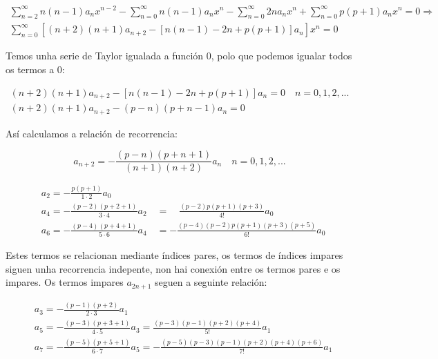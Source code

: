 \documentclass[a4paper,12pt,titlepage]{article}
\begin{document}
\begin{equation*}
    \begin{gathered}
    \sum_{n=2}^{\infty} n(n-1)a_nx^{n-2} - \sum _{n=0}^{\infty} n(n-1)a_n x^n -\sum_{n=0}^{\infty} 2na_nx^n + \sum_{n=0}^{\infty}p(p+1)a_nx^n = 0 \Rightarrow \\
    \sum_{n=0}^{\infty} [(n+2)(n+1)a_{n+2}-[n(n-1)-2n+p(p+1)]a_n]x^n = 0
    \end{gathered}
\end{equation*}

Temos unha serie de Taylor igualada a función 0, polo que podemos igualar todos os termos a 0:

\begin{equation*}
    \begin{gathered}
        (n+2)(n+1)a_{n+2}-[n(n-1)-2n+p(p+1)]a_n = 0 \quad n=0,1,2,... \\
        (n+2)(n+1)a_{n+2} - (p-n)(p+n-1)a_n = 0
    \end{gathered}
\end{equation*}

Así calculamos a relación de recorrencia:

\begin{equation*}
    a_{n+2} = -\frac{(p-n)(p+n+1)}{(n+1)(n+2)} a_{n} \quad n=0,1,2,...
\end{equation*}

\begin{equation*}
\begin{aligned}
    & a_{2}=-\frac{p(p+1)}{1 \cdot 2} a_{0} \\
    & a_{4}=-\frac{(p-2)(p+2+1)}{3 \cdot 4} a_{2} \quad=\quad \frac{(p-2) p(p+1)(p+3)}{4 !} a_{0} \\
    & a_{6}=-\frac{(p-4)(p+4+1)}{5 \cdot 6} a_{4} \quad=-\frac{(p-4)(p-2) p(p+1)(p+3)(p+5)}{6 !} a_{0}
\end{aligned}
\end{equation*}

Estes termos se relacionan mediante índices pares, os termos de índices impares siguen unha recorrencia indepente, non hai conexión entre os termos pares e os impares. Os termos impares $a_{2n+1}$ seguen a seguinte relación:

\begin{equation*}
\begin{aligned}
    & a_{3}=-\frac{(p-1)(p+2)}{2 \cdot 3} a_{1} \\
    & a_{5}=-\frac{(p-3)(p+3+1)}{4 \cdot 5} a_{3}=\frac{(p-3)(p-1)(p+2)(p+4)}{5 !} a_{1} \\
    & a_{7}=-\frac{(p-5)(p+5+1)}{6 \cdot 7} a_{5}=-\frac{(p-5)(p-3)(p-1)(p+2)(p+4)(p+6)}{7 !} a_{1}
\end{aligned}
\end{equation*}
\end{document}
